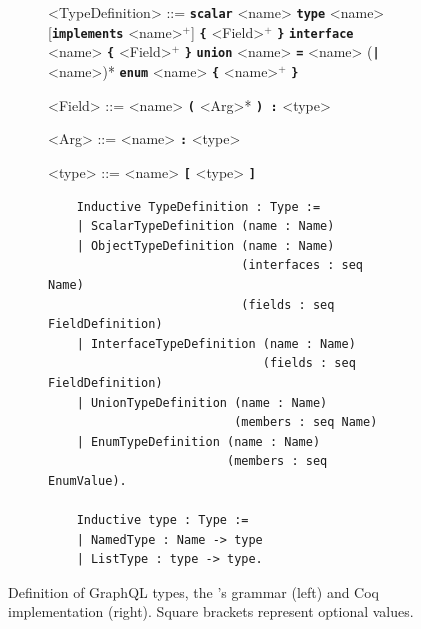 \setlength{\grammarparsep}{10pt plus 1pt minus 1pt} %
\begin{figure}[h]
    \centering
    \begin{subfigure}{.5\textwidth}
    \begin{grammar}
    <TypeDefinition> ::= \textbf{\texttt{scalar}} <name>
    \alt \textbf{\texttt{type}} <name> [\textbf{\texttt{implements}} <name>$^{+}$] \textbf{\texttt{\{}} <Field>$^{+}$ \textbf{\texttt{\}}}
    \alt \textbf{\texttt{interface}} <name> \textbf{\texttt{\{}} <Field>$^{+}$ \textbf{\texttt{\}}}
    \alt \textbf{\texttt{union}} <name> \textbf{\texttt{=}} <name> (\textbf{\texttt{|}} <name>)*
    \alt \textbf{\texttt{enum}} <name>  \textbf{\texttt{\{}}  <name>$^{+}$ \textbf{\texttt{\}}}

    <Field> ::= <name> \textbf{\texttt{(}} <Arg>* \textbf{\texttt{) :}} <type>

    <Arg> ::= <name> \textbf{\texttt{:}} <type>

    <type> ::= <name>
    \alt \textbf{\texttt{[}}  <type> \textbf{\texttt{]}}
    \end{grammar}

    \end{subfigure}%
    \begin{subfigure}{.5\textwidth}
    \begin{verbatim}
    Inductive TypeDefinition : Type :=
    | ScalarTypeDefinition (name : Name)
    | ObjectTypeDefinition (name : Name)
                           (interfaces : seq Name)
                           (fields : seq FieldDefinition)
    | InterfaceTypeDefinition (name : Name)
                              (fields : seq FieldDefinition)
    | UnionTypeDefinition (name : Name)
                          (members : seq Name)
    | EnumTypeDefinition (name : Name)
                         (members : seq EnumValue).

    Inductive type : Type :=
    | NamedType : Name -> type
    | ListType : type -> type.
    \end{verbatim}

    \end{subfigure}
    \caption{Definition of GraphQL types, the \spec{}'s grammar (left) and Coq implementation (right). Square brackets represent optional values.}
    \label{fig:types_def}
\end{figure}



